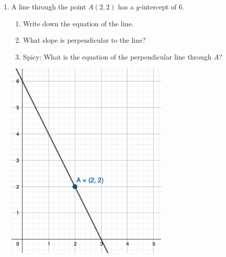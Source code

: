 \documentclass[12pt, twoside]{article}
\begin{document}
\begin{enumerate}
\newpage
\item A line through the point $A(2,2)$ has a $y$-intercept of 6. 
\begin{enumerate}
  \item Write down the equation of the line.
  \item What slope is perpendicular to the line?
  \item Spicy: What is the equation of the perpendicular line through $A$?
\end{enumerate}
\begin{flushright}
  \includegraphics[width=8cm]{6-16-9-perpendicular.png}
\end{flushright}


\end{enumerate}
\end{document}
